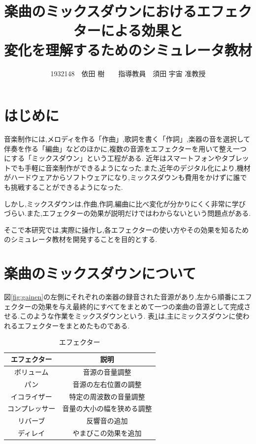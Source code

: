 \documentclass[twocolumn,10pt,a4j]{ltjsarticle}
\title{楽曲のミックスダウンにおけるエフェクターによる効果と\\変化を理解するためのシミュレータ教材}
\author{1932148　依田 樹　　指導教員　須田 宇宙 准教授}
\date{}
\begin{document}
\maketitle

\section{はじめに}
音楽制作には,メロディを作る「作曲」,歌詞を書く「作詞」,楽器の音を選択して伴奏を作る「編曲」などのほかに,複数の音源をエフェクターを用いて整え一つにする「ミックスダウン」という工程がある\cite{mix}.
近年はスマートフォンやタブレットでも手軽に音楽制作ができるようになった.また,近年のデジタル化により,機材がハードウェアからソフトウェアになり,ミックスダウンも費用をかけずに誰でも挑戦することができるようになった\cite{digital}.

しかし,ミックスダウンは,作曲,作詞,編曲に比べ変化が分かりにくく非常に学びづらい.また,エフェクターの効果が説明だけではわからないという問題点がある.

そこで本研究では,実際に操作し,各エフェクターの使い方やその効果を知るためのシミュレータ教材を開発することを目的とする.

\section{楽曲のミックスダウンについて}
図\ref{fig:gainen}の左側にそれぞれの楽器の録音された音源があり,左から順番にエフェクターの効果を与え最終的にすべてをまとめて一つの楽曲の音源として完成させる.このような作業をミックスダウンという.
表\ref{table:effector}は,主にミックスダウンに使われるエフェクターをまとめたものである.

\begin{table}[h]
  \caption{エフェクター}
  \label{table:effector}
  \begin{tabular}{cc}
    \hline
    エフェクター  & 説明    \\
    \hline \hline
    ボリューム  & 音源の音量調整 \\
    \hline
    パン  & 音源の左右位置の調整 \\
    \hline
    イコライザー  &  特定の周波数の音量調整 \\
    \hline
    コンプレッサー  &  音量の大小の幅を狭める調整 \\
    \hline
    リバーブ &  反響音の追加 \\
    \hline
    ディレイ  &  やまびこの効果を追加 \\
    \hline
  \end{tabular}
\end{table}
\end{document}
